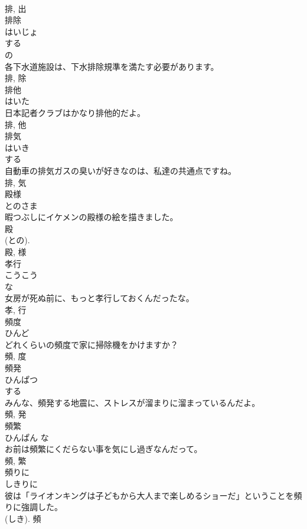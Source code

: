 \documentclass[8pt]{extreport}
\begin{document}
\begin{CJK}{UTF8}{min}
\\	排, 出	
\\	排除	
\\	はいじょ	
\\	する 
\\	の 
\\	各下水道施設は、下水排除規準を満たす必要があります。	
\\	排, 除	
\\	排他	
\\	はいた	
\\	日本記者クラブはかなり排他的だよ。	
\\	排, 他	
\\	排気	
\\	はいき	
\\	する 
\\	自動車の排気ガスの臭いが好きなのは、私達の共通点ですね。	
\\	排, 気	
\\	殿様	
\\	とのさま	
\\	暇つぶしにイケメンの殿様の絵を描きました。	
\\	殿 
\\	(との). 
\\	殿, 様	
\\	孝行	
\\	こうこう	
\\	な 
\\	女房が死ぬ前に、もっと孝行しておくんだったな。	
\\	孝, 行	
\\	頻度	
\\	ひんど	
\\	どれくらいの頻度で家に掃除機をかけますか？	
\\	頻, 度	
\\	頻発	
\\	ひんぱつ	
\\	する 
\\	みんな、頻発する地震に、ストレスが溜まりに溜まっているんだよ。	
\\	頻, 発	
\\	頻繁	
\\	ひんぱん	な 
\\	お前は頻繁にくだらない事を気にし過ぎなんだって。	
\\	頻, 繁	
\\	頻りに	
\\	しきりに	
\\	彼は「ライオンキングは子どもから大人まで楽しめるショーだ」ということを頻りに強調した。	
\\	(しき).	頻	

\end{CJK}
\end{document}
